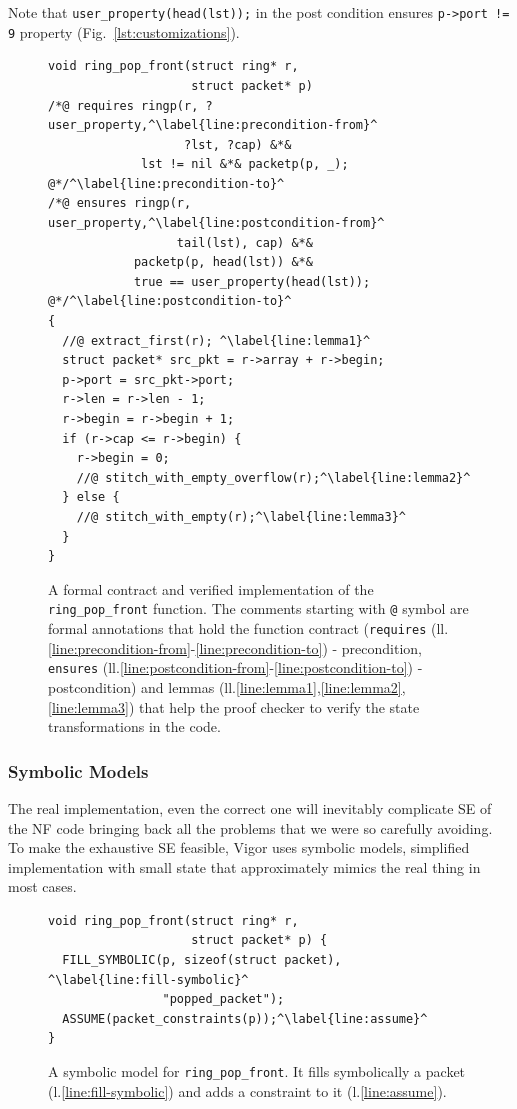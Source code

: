 \documentclass[letterpaper,twocolumn,10pt]{article}
\newcommand{\code}[1]{\lstinline{#1}}
\begin{document}
Note that \code{user_property(head(lst));} in the post condition ensures
\code{p->port != 9} property (Fig.~\ref{lst:customizations}).

\begin{figure}[h!]
\begin{lstlisting}
void ring_pop_front(struct ring* r,
                    struct packet* p)
/*@ requires ringp(r, ?user_property,^\label{line:precondition-from}^
                   ?lst, ?cap) &*&
             lst != nil &*& packetp(p, _); @*/^\label{line:precondition-to}^
/*@ ensures ringp(r, user_property,^\label{line:postcondition-from}^
                  tail(lst), cap) &*&
            packetp(p, head(lst)) &*&
            true == user_property(head(lst)); @*/^\label{line:postcondition-to}^
{
  //@ extract_first(r); ^\label{line:lemma1}^
  struct packet* src_pkt = r->array + r->begin;
  p->port = src_pkt->port;
  r->len = r->len - 1;
  r->begin = r->begin + 1;
  if (r->cap <= r->begin) {
    r->begin = 0;
    //@ stitch_with_empty_overflow(r);^\label{line:lemma2}^
  } else {
    //@ stitch_with_empty(r);^\label{line:lemma3}^
  }
}
\end{lstlisting}
  \caption{A formal contract and verified implementation of the
    \code{ring_pop_front} function. The comments starting with \code{@} symbol
    are formal annotations that hold the function contract
    (\code{requires} (ll.\ref{line:precondition-from}-\ref{line:precondition-to})
    - precondition,
    \code{ensures} (ll.\ref{line:postcondition-from}-\ref{line:postcondition-to})
    - postcondition) and
    lemmas (ll.\ref{line:lemma1},\ref{line:lemma2},\ref{line:lemma3}) that help
    the proof checker to verify the state transformations in the code.}
  \label{lst:contract}
\end{figure}

\subsubsection{Symbolic Models}

The real implementation, even the correct one will inevitably complicate SE
of the NF code bringing back all the problems that we were so carefully
avoiding. To make the exhaustive SE feasible, Vigor uses symbolic models,
simplified implementation with small state that approximately mimics the real
thing in most cases.

\begin{figure}[h!]
\begin{lstlisting}
void ring_pop_front(struct ring* r,
                    struct packet* p) {
  FILL_SYMBOLIC(p, sizeof(struct packet), ^\label{line:fill-symbolic}^
                "popped_packet");
  ASSUME(packet_constraints(p));^\label{line:assume}^
}
\end{lstlisting}
  \caption{A symbolic model for \code{ring_pop_front}. It fills symbolically a
    packet (l.\ref{line:fill-symbolic}) and adds a constraint to it
    (l.\ref{line:assume}).}
  \label{lst:symbolic-model}
\end{figure}
\end{document}

